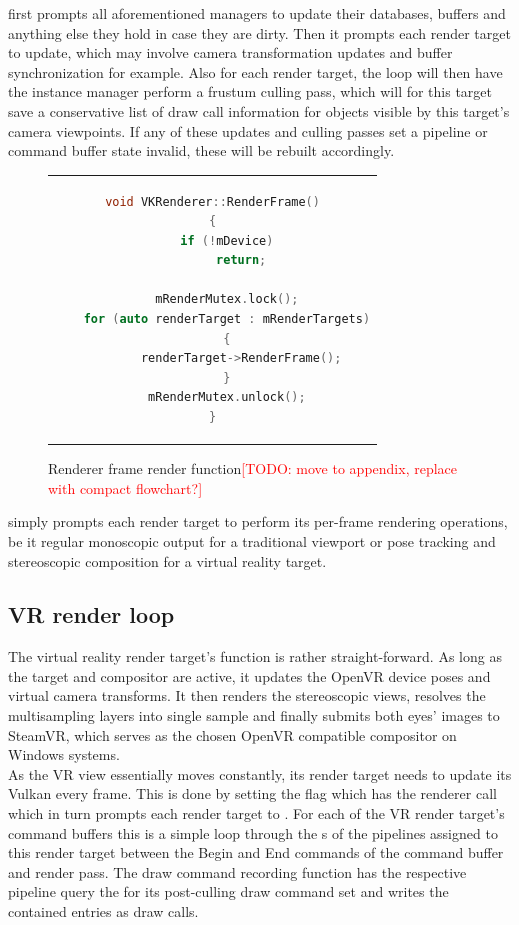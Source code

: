  first prompts all aforementioned managers to update their databases, buffers and anything else they hold in case they are dirty. Then it prompts each render target to update, which may involve camera transformation updates and buffer synchronization for example. Also for each render target, the loop will then have the instance manager perform a frustum culling pass, which will for this target save a conservative list of draw call information for objects visible by this target's camera viewpoints. 
If any of these updates and culling passes set a pipeline or command buffer state invalid, these will be rebuilt accordingly.  

\begin{figure}[htb]
  \centering
  \begin{tabular}{c}
  \begin{lstlisting}[language=C++]
void VKRenderer::RenderFrame()
{
	if (!mDevice)
		return;

	mRenderMutex.lock();
	for (auto renderTarget : mRenderTargets)
	{
		renderTarget->RenderFrame();
	}
	mRenderMutex.unlock();
}
	\end{lstlisting}
  \end{tabular}
  \caption[VKRenderer's RenderFrame]{Renderer frame render function\textcolor{red}{[TODO: move to appendix, replace with compact flowchart?]}}\label{fig:lst_VKRenderer_RenderFrame}
\end{figure}

 simply prompts each render target to perform its per-frame rendering operations, be it regular monoscopic output for a traditional viewport or pose tracking and stereoscopic composition for a virtual reality target. 

\subsection{VR render loop}
The virtual reality render target's  function is rather straight-forward. 
As long as the target and compositor are active, it updates the OpenVR device poses and virtual camera transforms. It then renders the stereoscopic views, resolves the multisampling layers into single sample and finally submits both eyes' images to SteamVR, which serves as the chosen OpenVR compatible compositor on Windows systems. \\

As the VR view essentially moves constantly, its render target needs to update its Vulkan  every frame. This is done by setting the  flag which has the renderer call  which in turn prompts each render target to . For each of the VR render target's command buffers this is a simple loop through the s of the pipelines assigned to this render target between the Begin and End commands of the command buffer and render pass. The draw command recording function has the respective pipeline query the  for its post-culling draw command set and writes the contained entries as  draw calls. 

